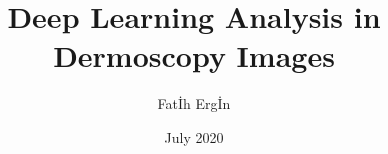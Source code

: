 
%

%


%
%
\author{Fatİh Ergİn}
\title{Deep Learning Analysis in Dermoscopy Images}
%
%
\date{July 2020}
%

%

%

%

%

\setlength{\jot}{20pt}
\usepackage[pdftex]{hyperref}
\usepackage[all]{hypcap}

\addtolength{\textheight}{1.5cm}
\newlength\myindent
\setlength\myindent{6em}
\newcommand\bindent{%
  \begingroup
  \setlength{\itemindent}{\myindent}
  \addtolength{\algorithmicindent}{\myindent}
}
\newcommand\eindent{\endgroup}


%
%
%

%
%

%

%

%

%

%

%

%
%






